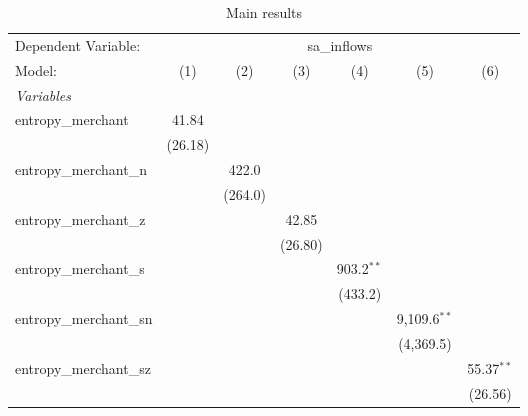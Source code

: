 
\begin{table}[htbp]
   \centering
   \footnotesize
   \begin{threeparttable}[b]
      \caption{\label{tab:reg_sa_inflows_merchant.tex} Main results}
      \begin{tabular}{lcccccc}
         \tabularnewline \midrule \midrule
         Dependent Variable: & \multicolumn{6}{c}{sa\_inflows}\\
         Model:                  & (1)            & (2)            & (3)            & (4)            & (5)            & (6)\\  
         \midrule
         \emph{Variables}\\
         entropy\_merchant       & 41.84          &                &                &                &                &   \\   
                                 & (26.18)        &                &                &                &                &   \\   
         entropy\_merchant\_n    &                & 422.0          &                &                &                &   \\   
                                 &                & (264.0)        &                &                &                &   \\   
         entropy\_merchant\_z    &                &                & 42.85          &                &                &   \\   
                                 &                &                & (26.80)        &                &                &   \\   
         entropy\_merchant\_s    &                &                &                & 903.2$^{**}$   &                &   \\   
                                 &                &                &                & (433.2)        &                &   \\   
         entropy\_merchant\_sn   &                &                &                &                & 9,109.6$^{**}$ &   \\   
                                 &                &                &                &                & (4,369.5)      &   \\   
         entropy\_merchant\_sz   &                &                &                &                &                & 55.37$^{**}$\\   
                                 &                &                &                &                &                & (26.56)\\   

\end{tabular}
\end{threeparttable}
\end{table}
